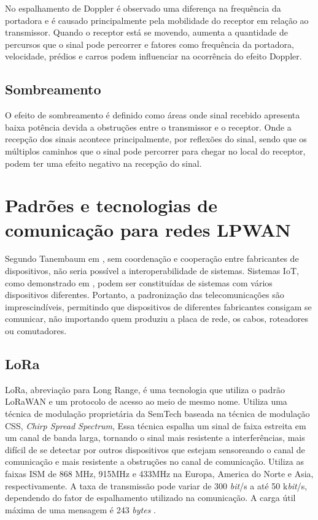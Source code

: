 No espalhamento de Doppler é observado uma diferença na frequência da portadora e é causado principalmente pela mobilidade do receptor em relação ao transmissor. Quando o receptor está se movendo, aumenta a quantidade de percursos que o sinal pode percorrer e fatores como frequência da portadora, velocidade, prédios e carros podem influenciar na ocorrência do efeito Doppler.


\subsection*{Sombreamento}
O efeito de sombreamento é definido como áreas onde sinal recebido apresenta baixa potência devida a obstruções entre o transmissor e o receptor. Onde a recepção dos sinais acontece principalmente, por reflexões do sinal, sendo que os múltiplos caminhos que o sinal pode percorrer para chegar no local do receptor, podem ter uma efeito negativo na recepção do sinal.


\section{Padrões e tecnologias de comunicação para redes LPWAN}
\label{padrõesSF}
Segundo Tanembaum em \cite{tanembaum2011}, sem coordenação e cooperação entre fabricantes de dispositivos, não seria possível a interoperabilidade de sistemas. Sistemas IoT, como demonstrado em \cite{sotres2017practical}, podem ser constituídas de sistemas com vários dispositivos diferentes. Portanto, a padronização das telecomunicações são imprescindíveis, permitindo que dispositivos de diferentes fabricantes consigam se comunicar, não importando quem produziu a placa de rede, os cabos, roteadores ou comutadores.

\subsection{LoRa}
LoRa, abreviação para Long Range, é uma tecnologia que utiliza o padrão LoRaWAN e um protocolo de acesso ao meio de mesmo nome. Utiliza uma técnica de modulação proprietária da SemTech baseada na técnica de modulação CSS, \emph{Chirp Spread Spectrum}, Essa técnica espalha um sinal de faixa estreita em um canal de banda larga, tornando o sinal mais resistente a interferências, mais difícil de se detectar por outros dispositivos que estejam sensoreando o canal de comunicação e mais resistente a obstruções no canal de comunicação. Utiliza as faixas ISM de 868 MHz, 915MHz e 433MHz na Europa, America do Norte e Asia, respectivamente. A taxa de transmissão pode variar de 300 \emph{bit}/s a até 50 k\emph{bit}/s, dependendo do fator de espalhamento utilizado na comunicação. A carga útil máxima de uma mensagem é 243 \emph{bytes} \cite{mekki2019comparative}.

